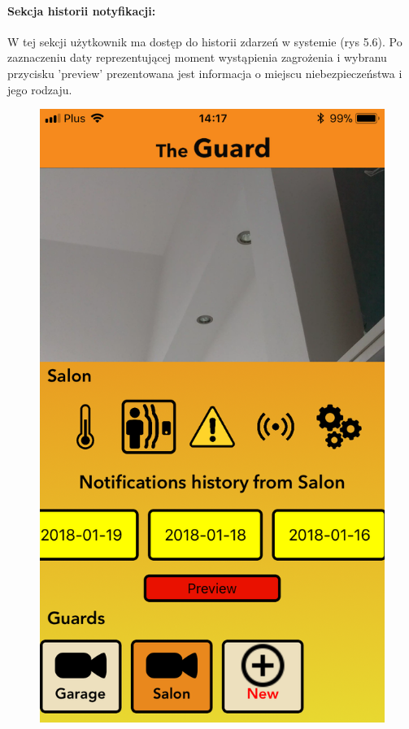 \paragraph{Sekcja historii notyfikacji:}
W tej sekcji użytkownik ma dostęp do historii zdarzeń w systemie (rys 5.6). Po zaznaczeniu daty reprezentującej moment wystąpienia zagrożenia i wybranu przycisku 'preview' prezentowana jest informacja o miejscu niebezpieczeństwa i jego rodzaju. 
\begin{figure}[ht]
\centering
\begin{minipage}{.4\linewidth}
    \includegraphics[width=\linewidth]{ios_screenshots/history.png}

\end{minipage}
\end{figure}
